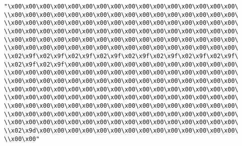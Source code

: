 \verb|"\x00\x00\x00\x00\x00\x00\x00\x00\x00\x00\x00\x00\x00\x00\x00\x00\|\newline
\verb|\\x00\x00\x00\x00\x00\x00\x00\x00\x00\x00\x00\x00\x00\x00\x00\x00\|\newline
\verb|\\x00\x00\x00\x00\x00\x00\x00\x00\x00\x00\x00\x00\x00\x00\x00\x00\|\newline
\verb|\\x00\x00\x00\x00\x00\x00\x00\x00\x00\x00\x00\x00\x00\x00\x00\x00\|\newline
\verb|\\x00\x00\x00\x00\x00\x00\x00\x00\x00\x00\x00\x00\x00\x00\x00\x00\|\newline
\verb|\\x00\x00\x00\x00\x00\x00\x00\x00\x00\x00\x00\x00\x00\x00\x00\x00\|\newline
\verb|\\x02\x9f\x02\x9f\x02\x9f\x02\x9f\x02\x9f\x02\x9f\x02\x9f\x02\x9f\|\newline
\verb|\\x02\x9f\x02\x9f\x00\x00\x00\x00\x00\x00\x00\x00\x00\x00\x00\x00\|\newline
\verb|\\x00\x00\x00\x00\x00\x00\x00\x00\x00\x00\x00\x00\x00\x00\x00\x00\|\newline
\verb|\\x00\x00\x00\x00\x00\x00\x00\x00\x00\x00\x00\x00\x00\x00\x00\x00\|\newline
\verb|\\x00\x00\x00\x00\x00\x00\x00\x00\x00\x00\x00\x00\x00\x00\x00\x00\|\newline
\verb|\\x00\x00\x00\x00\x00\x00\x00\x00\x00\x00\x00\x00\x00\x00\x00\x00\|\newline
\verb|\\x00\x00\x00\x00\x00\x00\x00\x00\x00\x00\x00\x00\x00\x00\x00\x00\|\newline
\verb|\\x00\x00\x00\x00\x00\x00\x00\x00\x00\x00\x00\x00\x00\x00\x00\x00\|\newline
\verb|\\x00\x00\x00\x00\x00\x00\x00\x00\x00\x00\x00\x00\x00\x00\x00\x00\|\newline
\verb|\\x02\x9d\x00\x00\x00\x00\x00\x00\x00\x00\x00\x00\x00\x00\x00\x00\|\newline
\verb|\\x00\x00"|\newline
